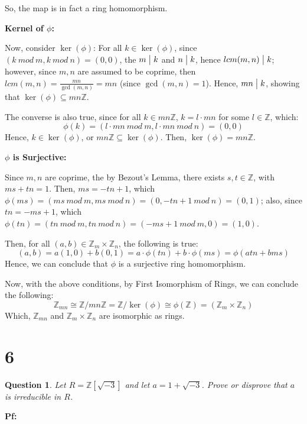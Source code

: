 \documentclass{article}
\newtheorem{question}{Question}
\begin{document}
So, the map is in fact a ring homomorphism.

\hfill

\textbf{Kernel of $\phi$:}

Now, consider $\ker(\phi)$: For all $k\in\ker(\phi)$, since $(k\ mod\ m,k\ mod\ n)=(0,0)$, the $m\bigm |k$ and $n\bigm |k$,
hence $lcm(m,n)\bigm |k$; however, since $m,n$ are assumed to be coprime, then $lcm(m,n)=\frac{mn}{\gcd(m,n)}=mn$ (since $\gcd(m,n)=1$).
Hence, $mn\bigm |k$, showing that $\ker(\phi)\subseteq mn\mathbb{Z}$.

The converse is also true, since for all $k\in mn\mathbb{Z}$, $k=l\cdot mn$ for some $l\in\mathbb{Z}$, which:
$$\phi(k)=(l\cdot mn\ mod\ m,l\cdot mn\ mod\ n) = (0,0)$$
Hence, $k\in\ker(\phi)$, or $mn\mathbb{Z}\subseteq \ker(\phi)$. Then, $\ker(\phi)=mn\mathbb{Z}$.

\hfill

\textbf{$\phi$ is Surjective:}

Since $m,n$ are coprime, the by Bezout's Lemma, there exists $s,t\in\mathbb{Z}$, with $ms+tn=1$.
Then, $ms=-tn+1$, which $\phi(ms)=(ms\ mod\ m,ms\ mod\ n)=(0, -tn+1\ mod\ n)=(0,1)$;
also, since $tn=-ms+1$, which $\phi(tn)=(tn\ mod\ m, tn\ mod\ n)=(-ms+1\ mod\ m, 0)=(1,0)$.

Then, for all $(a,b)\in \mathbb{Z}_m\times\mathbb{Z}_n$, the following is true:
$$(a,b)=a(1,0)+b(0,1)=a\cdot\phi(tn)+b\cdot\phi(ms) = \phi(atn+bms)$$
Hence, we can conclude that $\phi$ is a surjective ring homomorphism.

\hfill

Now, with the above conditions, by First Isomorphism of Rings, we can conclude the following:
$$\mathbb{Z}_{mn}\cong \mathbb{Z}/mn\mathbb{Z}=\mathbb{Z}/\ker(\phi)\cong \phi(\mathbb{Z})=(\mathbb{Z}_m\times\mathbb{Z}_n)$$
Which, $\mathbb{Z}_{mn}$ and $\mathbb{Z}_m\times\mathbb{Z}_n$ are isomorphic as rings.

\break

\section*{6}
\begin{myBox}[]{}
    \begin{question}
        Let $R=\mathbb{Z}[\sqrt{-3}]$ and let $a = 1 + \sqrt{-3}$. Prove or disprove that $a$ is irreducible in $R$.
    \end{question}
\end{myBox}

\textbf{Pf:}
\end{document}
